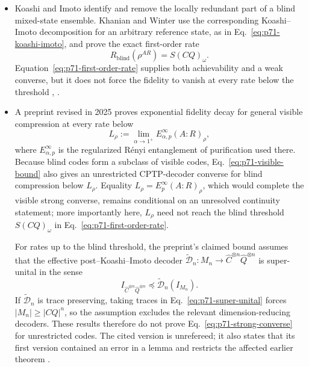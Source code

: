 \begin{itemize}
  \item Koashi and Imoto identify and remove the locally redundant part of a
  blind mixed-state ensemble.  Khanian and Winter use the corresponding
  Koashi--Imoto decomposition for an arbitrary reference state, as in
  Eq.~\eqref{eq:p71-koashi-imoto}, and prove the exact first-order rate
  \begin{equation}
    R_{\mathrm{blind}}(\rho^{AR})=S(CQ)_\omega.
    \label{eq:p71-first-order-rate}
  \end{equation}
  Equation~\eqref{eq:p71-first-order-rate} supplies both achievability and a
  weak converse, but it does not force the fidelity to vanish at every rate
  below the threshold
  ,
  .

  \item A preprint revised in 2025 proves exponential fidelity decay for
  general visible compression at every rate below
  \begin{equation}
    L_\rho
    :=\lim_{\alpha\to1^+}E_{\alpha,p}^{\infty}(A{:}R)_\rho,
    \label{eq:p71-visible-bound}
  \end{equation}
  where $E_{\alpha,p}^{\infty}$ is the regularized R\'enyi entanglement of
  purification used there.  Because blind codes form a subclass of visible
  codes, Eq.~\eqref{eq:p71-visible-bound} also gives an unrestricted
  CPTP-decoder converse for blind compression below $L_\rho$.  Equality
  $L_\rho=E_p^\infty(A{:}R)_\rho$, which would complete the visible strong
  converse, remains conditional on an unresolved continuity statement; more
  importantly here, $L_\rho$ need not reach the blind threshold
  $S(CQ)_\omega$ in Eq.~\eqref{eq:p71-first-order-rate}.

  For rates up to the blind threshold, the preprint's claimed bound assumes
  that the effective post--Koashi--Imoto decoder
  $\widetilde{\mathcal D}_n:M_n\to\widehat C^{\otimes n}\widehat Q^{\otimes n}$
  is super-unital in the sense
  \begin{equation}
    I_{\widehat C^{\otimes n}\widehat Q^{\otimes n}}
    \preceq\widetilde{\mathcal D}_n(I_{M_n}).
    \label{eq:p71-super-unital}
  \end{equation}
  If $\widetilde{\mathcal D}_n$ is trace preserving, taking traces in
  Eq.~\eqref{eq:p71-super-unital} forces
  $|M_n|\geq|CQ|^n$, so the assumption excludes the relevant
  dimension-reducing decoders.  These results therefore do not prove
  Eq.~\eqref{eq:p71-strong-converse} for unrestricted codes.  The cited
  version is unrefereed; it also states that its first version contained an
  error in a lemma and restricts the affected earlier theorem
  .
\end{itemize}

